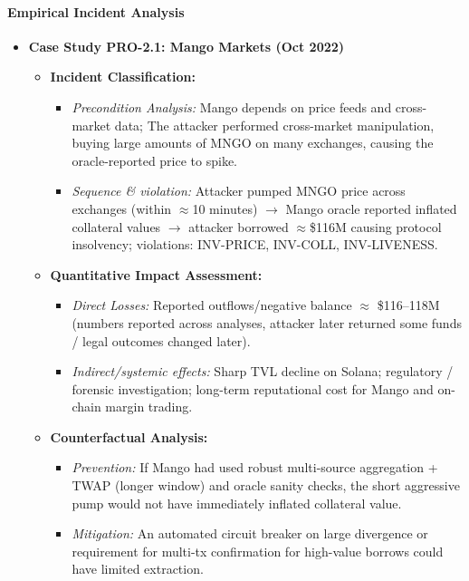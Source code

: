 \paragraph{Empirical Incident Analysis}
\begin{itemize}
    \item \textbf{Case Study PRO-2.1: Mango Markets (Oct 2022)}
        \begin{itemize}
            \item \textbf{Incident Classification:}
                \begin{itemize}
                    \item \textit{Precondition Analysis:} Mango depends on price feeds and cross-market data; The attacker performed cross-market manipulation, buying large amounts of MNGO on many exchanges, causing the oracle-reported price to spike. \cite{solidus2022mango}
                    \item \textit{Sequence \& violation:} Attacker pumped MNGO price across exchanges (within $\approx$10 minutes) $\rightarrow$ Mango oracle reported inflated collateral values $\rightarrow$ attacker borrowed $\approx$\$116M causing protocol insolvency; violations: INV-PRICE, INV-COLL, INV-LIVENESS. \cite{akartuna2022mango}
                \end{itemize}
            \item \textbf{Quantitative Impact Assessment:}
                \begin{itemize}
                    \item \textit{Direct Losses:} Reported outflows/negative balance $\approx$ \$116--118M (numbers reported across analyses, attacker later returned some funds / legal outcomes changed later).
                    \item \textit{Indirect/systemic effects:} Sharp TVL decline on Solana; regulatory / forensic investigation; long-term reputational cost for Mango and on-chain margin trading.
                \end{itemize}
            \item \textbf{Counterfactual Analysis:}
                \begin{itemize}
                    \item \textit{Prevention:} If Mango had used robust multi-source aggregation + TWAP (longer window) and oracle sanity checks, the short aggressive pump would not have immediately inflated collateral value. \cite{chainlink2021defi}
                    \item \textit{Mitigation:} An automated circuit breaker on large divergence or requirement for multi-tx confirmation for high-value borrows could have limited extraction. \cite{chainalysis2023oracle}

\end{itemize}
\end{itemize}
\end{itemize}
